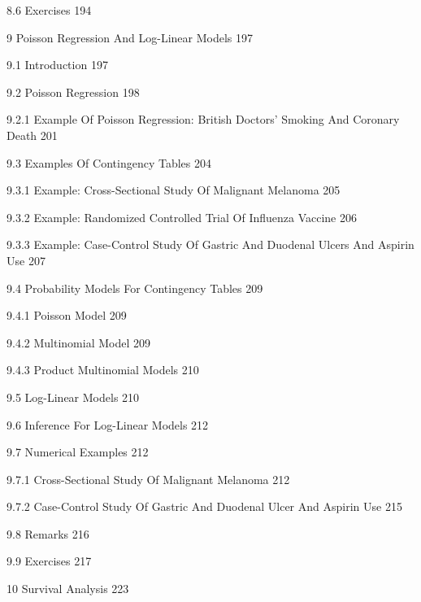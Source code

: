 8.6 Exercises 194



9 Poisson Regression And Log-Linear Models 197



9.1 Introduction 197



9.2 Poisson Regression 198



9.2.1 Example Of Poisson Regression: British Doctors' Smoking And Coronary Death 201



9.3 Examples Of Contingency Tables 204



9.3.1 Example: Cross-Sectional Study Of Malignant Melanoma 205



9.3.2 Example: Randomized Controlled Trial Of Influenza Vaccine 206



9.3.3 Example: Case-Control Study Of Gastric And Duodenal Ulcers And Aspirin Use 207



9.4 Probability Models For Contingency Tables 209



9.4.1 Poisson Model 209



9.4.2 Multinomial Model 209



9.4.3 Product Multinomial Models 210



9.5 Log-Linear Models 210



9.6 Inference For Log-Linear Models 212



9.7 Numerical Examples 212



9.7.1 Cross-Sectional Study Of Malignant Melanoma 212



9.7.2 Case-Control Study Of Gastric And Duodenal Ulcer And Aspirin Use 215



9.8 Remarks 216



9.9 Exercises 217



10 Survival Analysis 223



